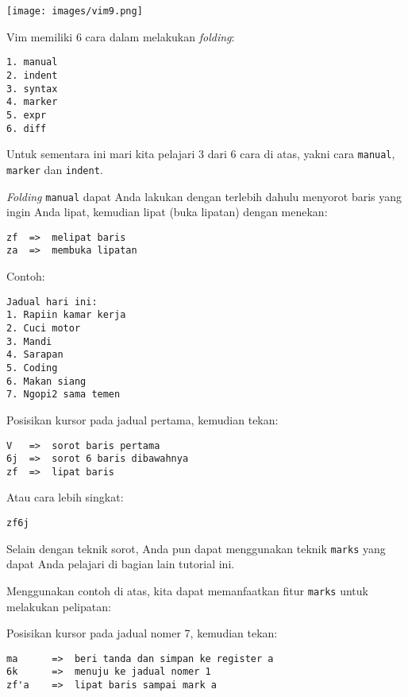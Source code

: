 \documentclass{article}
\begin{document}
\vspace{12pt}

\texttt{[image: images/vim9.png]}

\vspace{12pt}

Vim memiliki 6 cara dalam melakukan \emph{folding}:

\begin{verbatim}
1. manual
2. indent
3. syntax
4. marker
5. expr
6. diff
\end{verbatim}

Untuk sementara ini mari kita pelajari 3 dari 6 cara di
atas, yakni cara \verb=manual=, \verb=marker= dan
\verb=indent=.

\emph{Folding} \verb=manual= dapat Anda lakukan dengan
terlebih dahulu menyorot baris yang ingin Anda lipat,
kemudian lipat (buka lipatan) dengan menekan:

\begin{verbatim}
zf  =>  melipat baris
za  =>  membuka lipatan
\end{verbatim}

Contoh:

\begin{verbatim}
Jadual hari ini:
1. Rapiin kamar kerja
2. Cuci motor
3. Mandi
4. Sarapan
5. Coding
6. Makan siang
7. Ngopi2 sama temen
\end{verbatim}

Posisikan kursor pada jadual pertama, kemudian tekan:

\begin{verbatim}
V   =>  sorot baris pertama
6j  =>  sorot 6 baris dibawahnya
zf  =>  lipat baris
\end{verbatim}

Atau cara lebih singkat:

\begin{verbatim}
zf6j
\end{verbatim}

Selain dengan teknik sorot, Anda pun dapat menggunakan
teknik \verb=marks= yang dapat Anda pelajari di bagian lain
tutorial ini.

Menggunakan contoh di atas, kita dapat memanfaatkan fitur
\verb=marks= untuk melakukan pelipatan:

Posisikan kursor pada jadual nomer 7, kemudian tekan:

\begin{verbatim}
ma      =>  beri tanda dan simpan ke register a
6k      =>  menuju ke jadual nomer 1
zf'a    =>  lipat baris sampai mark a
\end{verbatim}
\end{document}
